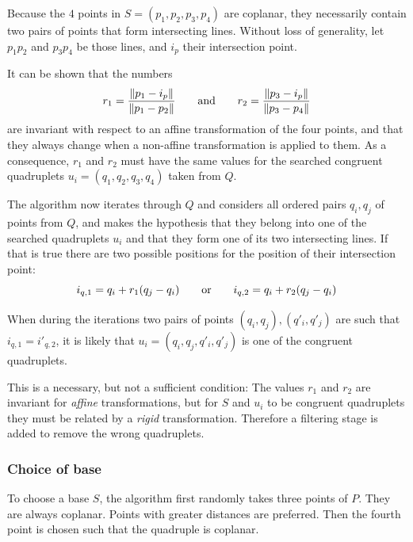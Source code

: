 Because the $4$ points in $S = (p_1, p_2, p_3, p_4)$ are coplanar, they necessarily contain two pairs of points that form intersecting lines. Without loss of generality, let $p_1 p_2$ and $p_3 p_4$ be those lines, and $i_p$ their intersection point.

It can be shown that the numbers
\begin{equation} \label{eq:4pcs_inv}
r_1 = \frac{\| p_1 - i_p \|}{\| p_1 - p_2 \|}
\hspace{7mm} \text{and} \hspace{7mm}
r_2 = \frac{\| p_3 - i_p \|}{\| p_3 - p_4 \|}
\end{equation}
are invariant with respect to an affine transformation of the four points, and that they always change when a non-affine transformation is applied to them. As a consequence, $r_1$ and $r_2$ must have the same values for the searched congruent quadruplets $u_i = (q_1, q_2, q_3, q_4)$ taken from $Q$.

The algorithm now iterates through $Q$ and considers all ordered pairs $q_i, q_j$ of points from $Q$, and makes the hypothesis that they belong into one of the searched quadruplets $u_i$ and that they form one of its two intersecting lines. If that is true there are two possible positions for the position of their intersection point:
\begin{equation}
i_{q,1} = q_i + r_1 (q_j - q_i)
\hspace{7mm} \text{or} \hspace{7mm}
i_{q,2} = q_i + r_2 (q_j - q_i)
\end{equation}

When during the iterations two pairs of points $(q_i, q_j), (q'_i, q'_j)$ are such that $i_{q,1} = i'_{q,2}$, it is likely that $u_i = (q_i, q_j, q'_i, q'_j)$ is one of the congruent quadruplets.

This is a necessary, but not a sufficient condition: The values $r_1$ and $r_2$ are invariant for \emph{affine} transformations, but for $S$ and $u_i$ to be congruent quadruplets they must be related by a \emph{rigid} transformation. Therefore a filtering stage is added to remove the wrong quadruplets. 


\subsubsection{Choice of base}
To choose a base $S$, the algorithm first randomly takes three points of $P$. They are always coplanar. Points with greater distances are preferred. Then the fourth point is chosen such that the quadruple is coplanar.


